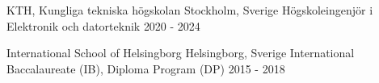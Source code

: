 \documentclass[../main.tex]{subfiles}
\begin{document}
\company
    {KTH, Kungliga tekniska högskolan} 
    {Stockholm, Sverige}
\titles
    {Högskoleingenjör i Elektronik och datorteknik}
    {2020 - 2024}

\company
    {International School of Helsingborg} 
    {Helsingborg, Sverige}
\titles
    {International Baccalaureate (IB), Diploma Program (DP)} 
    {2015 - 2018} 
    
\end{document}
